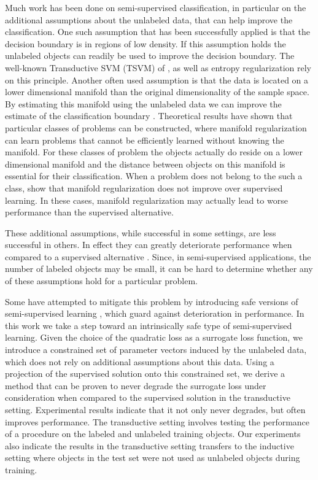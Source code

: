 \documentclass{article}
\begin{document}
Much work has been done on semi-supervised classification, in particular on the additional assumptions about the unlabeled data, that can help improve the classification. One such assumption that has been successfully applied is that the decision boundary is in regions of low density. If this assumption holds the unlabeled objects can readily be used to improve the decision boundary. The well-known Transductive SVM (TSVM) of \cite{Joachims1999}, as well as entropy regularization \cite{Grandvalet2005} rely on this principle. Another often used assumption is that the data is located on a lower dimensional manifold than the original dimensionality of the sample space. By estimating this manifold using the unlabeled data we can improve the estimate of the classification boundary \cite{Zhu2003,Belkin2006}. Theoretical results have shown that particular classes of problems can be constructed, where manifold regularization can learn problems \cite{Niyogi2013} that cannot be efficiently learned without knowing the manifold. For these classes of problem the objects actually do reside on a lower dimensional manifold and the distance between objects on this manifold is essential for their classification. When a problem does not belong to the such a class, \cite{Lafferty2007} show that manifold regularization does not improve over supervised learning. In these cases, manifold regularization may actually lead to worse performance than the supervised alternative.

These additional assumptions, while successful in some settings, are less successful in others. In effect they can greatly deteriorate performance when compared to a supervised alternative \cite{Cozman2006}. Since, in semi-supervised applications, the number of labeled objects may be small, it can be hard to determine whether any of these assumptions hold for a particular problem.

Some have attempted to mitigate this problem by introducing safe versions of semi-supervised learning \cite{Li2011,Loog2013a}, which  guard against deterioration in performance. In this work we take a step toward an intrinsically safe type of semi-supervised learning. Given the choice of the quadratic loss as a surrogate loss function, we introduce a constrained set of parameter vectors induced by the unlabeled data, which does not rely on additional assumptions about this data. Using a projection of the supervised solution onto this constrained set, we derive a method that can be proven to never degrade the surrogate loss under consideration when compared to the supervised solution in the transductive setting. Experimental results indicate that it not only never degrades, but often improves performance. The transductive setting involves testing the performance of a procedure on the labeled and unlabeled training objects. Our experiments also indicate the results in the transductive setting transfers to the inductive setting where objects in the test set were not used as unlabeled objects during training.
\end{document}
